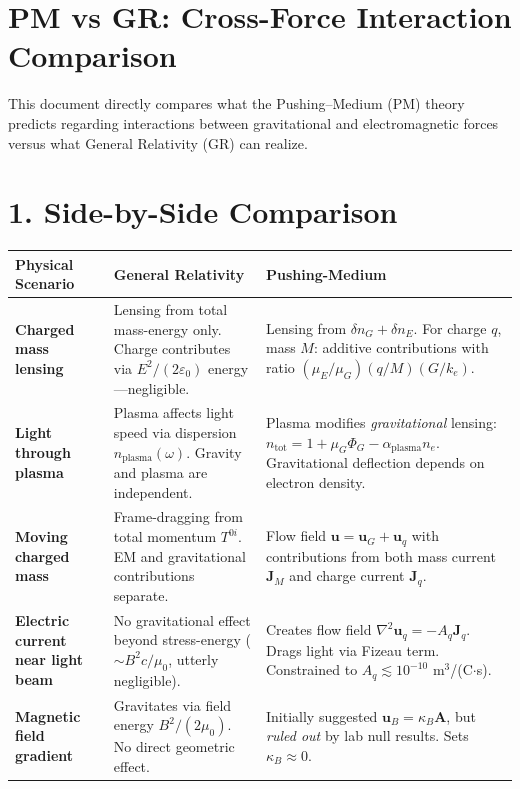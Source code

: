 \documentclass{article}
\begin{document}
\section*{PM vs GR: Cross-Force Interaction Comparison}

This document directly compares what the Pushing--Medium (PM) theory predicts
regarding interactions between gravitational and electromagnetic forces versus
what General Relativity (GR) can realize.

\section*{1. Side-by-Side Comparison}

\begin{center}
\begin{tabular}{p{4cm}|p{5cm}|p{5cm}}
\toprule
\textbf{Physical Scenario} & \textbf{General Relativity} & \textbf{Pushing-Medium} \\
\midrule
\textbf{Charged mass lensing} & 
Lensing from total mass-energy only. Charge contributes via $E^2/(2\varepsilon_0)$ energy—negligible. &
Lensing from $\delta n_G + \delta n_E$. For charge $q$, mass $M$: additive contributions with ratio $(\mu_E/\mu_G)(q/M)(G/k_e)$. \\
\midrule
\textbf{Light through plasma} & 
Plasma affects light speed via dispersion $n_{\text{plasma}}(\omega)$. Gravity and plasma are independent. &
Plasma modifies \emph{gravitational} lensing: $n_{\text{tot}} = 1 + \mu_G\Phi_G - \alpha_{\text{plasma}}n_e$. Gravitational deflection depends on electron density. \\
\midrule
\textbf{Moving charged mass} & 
Frame-dragging from total momentum $T^{0i}$. EM and gravitational contributions separate. &
Flow field $\mathbf u = \mathbf u_G + \mathbf u_q$ with contributions from both mass current $\mathbf J_M$ and charge current $\mathbf J_q$. \\
\midrule
\textbf{Electric current near light beam} & 
No gravitational effect beyond stress-energy ($\sim B^2 c / \mu_0$, utterly negligible). &
Creates flow field $\nabla^2\mathbf u_q = -A_q\mathbf J_q$. Drags light via Fizeau term. Constrained to $A_q \lesssim 10^{-10}$ m$^3$/(C$\cdot$s). \\
\midrule
\textbf{Magnetic field gradient} & 
Gravitates via field energy $B^2/(2\mu_0)$. No direct geometric effect. &
Initially suggested $\mathbf u_B = \kappa_B\mathbf A$, but \emph{ruled out} by lab null results. Sets $\kappa_B \approx 0$. \\

\end{tabular}
\end{center}
\end{document}
